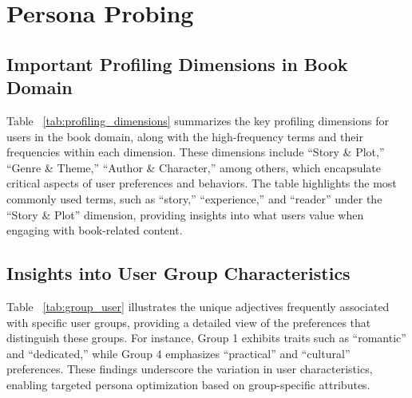 \newpage
\section{Persona Probing}

\subsection{Important Profiling Dimensions in Book Domain}
    Table ~\ref{tab:profiling_dimensions} summarizes the key profiling dimensions for users in the book domain, along with the high-frequency terms and their frequencies within each dimension. These dimensions include “Story \& Plot,” “Genre \& Theme,” “Author \& Character,” among others, which encapsulate critical aspects of user preferences and behaviors. The table highlights the most commonly used terms, such as “story,” “experience,” and “reader” under the “Story \& Plot” dimension, providing insights into what users value when engaging with book-related content.


\subsection{Insights into User Group Characteristics}
Table ~\ref{tab:group_user} illustrates the unique adjectives frequently associated with specific user groups, providing a detailed view of the preferences that distinguish these groups. For instance, Group 1 exhibits traits such as “romantic” and “dedicated,” while Group 4 emphasizes “practical” and “cultural” preferences. These findings underscore the variation in user characteristics, enabling targeted persona optimization based on group-specific attributes.

